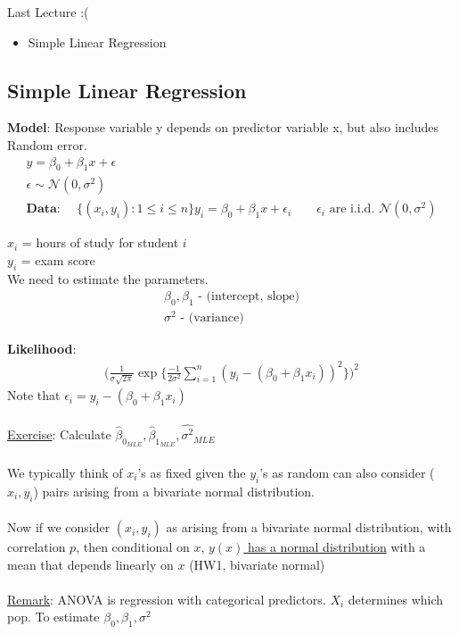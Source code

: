 {\Large Last Lecture :(}

\begin{itemize}
	\item Simple Linear Regression
\end{itemize}
\subsection*{Simple Linear Regression}
\textbf{Model}: Response variable y depends on predictor variable x, but also includes Random error.
\begin{gather*}
	y = \beta_0 + \beta_1 x + \epsilon\\
	\epsilon \sim \mathcal{N}(0, \sigma^2)\\
	\textbf{Data: } \quad \{ (x_i, y_i) : 1 \leq i \leq n\}
	y_i = \beta_0 + \beta_1 x + \epsilon_i \qquad \boxed{\epsilon_i \text{ are i.i.d. } \mathcal{N}(0, \sigma^2)}
\end{gather*}
\begin{example-N}
	$x_i$ = hours of study for student $i$\\
	$y_i$ = exam score\\
	We need to estimate the parameters.
	\begin{gather*}
		\beta_0, \beta_1 \text{ - (intercept, slope)}\\
		\sigma^2 \text{ - (variance)}
	\end{gather*}
\end{example-N}
\textbf{Likelihood}:
\begin{gather*}
	\bigg(\frac{1}{\sigma \sqrt{2\pi}} \exp\bigg\{ \frac{-1}{2\sigma^2}\sum_{i=1}^n (y_i - (\beta_0 + \beta_1 x_i))^2 \bigg\}  \bigg)^2
\end{gather*}
Note that $\epsilon_i = y_i - (\beta_0 + \beta_1 x_i)$\\\\
\underline{Exercise}: Calculate $\hat{\beta}_{0_{MLE}}, \hat{\beta}_{1_{MLE}}, \hat{\sigma^2}_{MLE}$\\\\
We typically think of $x_i$'s as fixed given the $y_i$'s as random can also consider ($x_i, y_i$) pairs arising from a bivariate normal distribution.\\\\
Now if we consider $(x_i, y_i)$ as arising from a bivariate normal distribution, with correlation $p$, then conditional on $x$, \underline{$y(x)$ has a normal distribution} with a mean that depends linearly on $x$ (HW1, bivariate normal)\\\\
\underline{Remark}: ANOVA is regression with categorical predictors. $X_i$ determines which pop. To estimate $\beta_0, \beta_1, \sigma^2$
